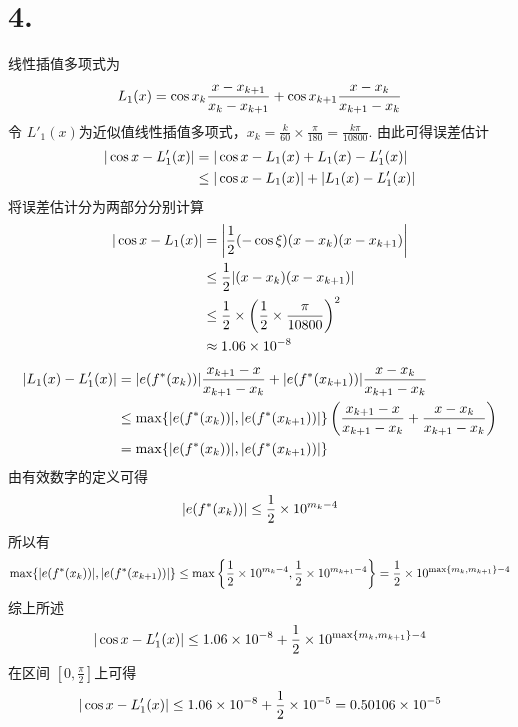 \documentclass[12pt, a4paper, oneside]{ctexart}
\begin{document}
\section*{4.}
\noindent
线性插值多项式为 
\begin{equation}
    L_1(x) = \cos x_k \frac{x-x_{k+1}}{x_k-x_{k+1}}+\cos x_{k+1}\frac{x-x_k}{x_{k+1}-x_k} \notag
\end{equation}
令 $L'_1(x)$为近似值线性插值多项式，$x_k = \frac{k}{60} \times \frac{\pi}{180} = \frac{k\pi}{10800}$.
由此可得误差估计
\begin{equation}
    \begin{split}
        |\cos x - L'_1(x)| &= |\cos x - L_1(x) + L_1(x) - L'_1(x)| \\
        &\leq |\cos x - L_1(x)| + |L_1(x)-L'_1(x)|
    \end{split}
    \notag
\end{equation}
将误差估计分为两部分分别计算
\begin{equation}
    \begin{split}
        |\cos x - L_1(x)| &= \left| \frac{1}{2}(-\cos \xi)(x-x_k)(x-x_{k+1}) \right| \\
        &\leq \frac{1}{2} |(x-x_k)(x-x_{k+1})| \\
        &\leq \frac{1}{2}\times \left( \frac{1}{2} \times \frac{\pi}{10800} \right) ^2 \\
        &\approx 1.06 \times 10^{-8}
    \end{split}
    \notag
\end{equation}
\begin{equation}
    \begin{split}
        |L_1(x)-L'_1(x)| &= |e(f^*(x_k))|\frac{x_{k+1}-x}{x_{k+1}-x_k} + |e(f^*(x_{k+1}))|\frac{x-x_k}{x_{k+1}-x_k}\\
        &\leq \max \{|e(f^*(x_k))|, |e(f^*(x_{k+1}))|\} \left( \frac{x_{k+1}-x}{x_{k+1}-x_k} + \frac{x-x_k}{x_{k+1}-x_k} \right) \\
        &= \max \{|e(f^*(x_k))|, |e(f^*(x_{k+1}))|\}
    \end{split}
    \notag
\end{equation}
由有效数字的定义可得
\begin{equation}
    |e(f^*(x_k))| \leq \frac{1}{2}\times 10^{m_k-4} \notag
\end{equation}
所以有
\begin{equation}
    \max \{|e(f^*(x_k))|, |e(f^*(x_{k+1}))|\} \leq \max \left\{ \frac{1}{2}\times 10^{m_k-4}, \frac{1}{2}\times 10^{m_{k+1}-4} \right\} = \frac{1}{2}\times 10^{\max \{m_k, m_{k+1}\}-4} \notag
\end{equation}
综上所述
\begin{equation}
    |\cos x-L'_1(x)| \leq 1.06\times 10^{-8} + \frac{1}{2}\times 10^{\max \{m_k, m_{k+1}\}-4} \notag
\end{equation}
在区间 $[0, \frac{\pi}{2}]$上可得
\begin{equation}
    |\cos x-L'_1(x)|\leq 1.06 \times 10^{-8} + \frac{1}{2}\times 10^{-5} = 0.50106 \times 10^{-5} \notag
\end{equation}
\end{document}
